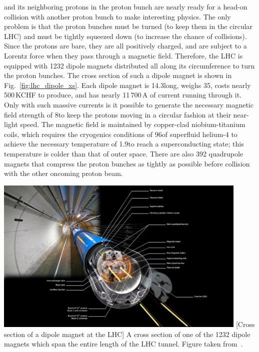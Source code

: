 \pname and its neighboring protons in the proton bunch are nearly ready for a head-on collision with another proton bunch to make interesting physics.
The only problem is that the proton bunches must be turned (to keep them in the circular LHC) and must be tightly squeezed down (to increase the chance of \pp collisions).
Since the protons are bare, they are all positively charged, and are subject to a Lorentz force when they pass through a magnetic field.
Therefore, the LHC is equipped with 1232 dipole magnets distributed all along its circumference to turn the proton bunches.
The cross section of such a dipole magnet is shown in Fig.~\ref{fig:lhc_dipole_xs}.
Each dipole magnet is 14.3\meter long, weighs 35\tonne, costs nearly 500\,KCHF to produce, and has nearly 11\,700\,A of current running through it.
Only with such massive currents is it possible to generate the necessary magnetic field strength of 8\tesla to keep the protons moving in a circular fashion at their near-light speed. 
The magnetic field is maintained by copper-clad niobium-titanium coils, which requires the cryogenics conditions of 96\tonne of superfluid helium-4 to achieve the necessary temperature of 1.9\kelvin to reach a superconducting state; 
this temperature is colder than that of outer space.
There are also 392 quadrupole magnets
that compress the proton bunches as tightly as possible before collision with the other oncoming proton beam.
\begin{multiFigure}
\centering
    \includegraphics[height=7.5cm,keepaspectratio]{figures/lhc/lhc_dipole_xs.jpg}
        [Cross section of a dipole magnet at the LHC]
        {A cross section of one of the 1232 dipole magnets which span the entire length of the LHC tunnel.
        Figure taken from~\cite{PhysRevLett.114.191803}. %
        } 
    \label{fig:lhc_dipole_xs}
\end{multiFigure}

